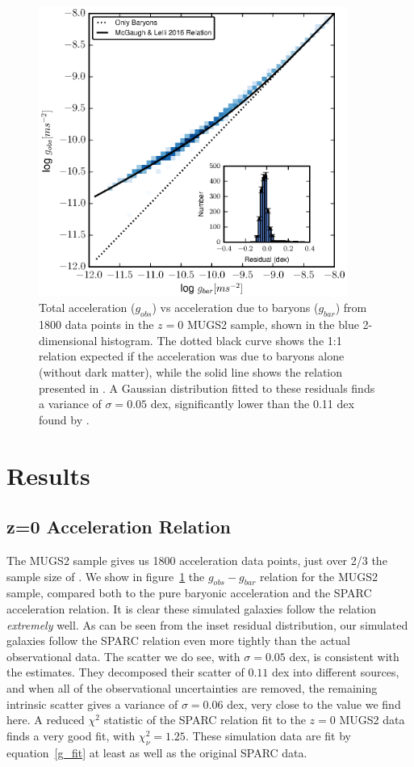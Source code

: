 \begin{figure}
    \includegraphics[width=0.9\textwidth]{figures4/SPARC_plot.eps}
    \caption[Total acceleration vs. baryonic acceleration in MUGS2]{Total
    acceleration ($g_{obs}$) vs acceleration due to baryons ($g_{bar}$) from
    1800 data points in the $z=0$ MUGS2 sample, shown in the blue 2-dimensional
    histogram.  The dotted black curve shows the 1:1 relation expected if the
    acceleration was due to baryons alone (without dark matter), while the solid
    line shows the relation presented in \citet{McGaugh2016}.  A Gaussian
    distribution fitted to these residuals finds a variance of $\sigma=0.05$
    dex, significantly lower than the 0.11 dex found by \citet{McGaugh2016}.}
    \label{SPARC_plot}
\end{figure}
\section{Results}
\subsection{z=0 Acceleration Relation}
The MUGS2 sample gives us 1800 acceleration data points, just over 2/3 the
sample size of \citet{McGaugh2016}. We show in figure~\ref{SPARC_plot} the
$g_{obs}-g_{bar}$ relation for the MUGS2 sample, compared both to the pure
baryonic acceleration and the SPARC acceleration relation.  It is clear these
simulated galaxies follow the \citet{McGaugh2016} relation {\it extremely} well.
As can be seen from the inset residual distribution, our simulated galaxies
follow the SPARC relation even more tightly than the actual observational data.
The scatter we do see, with $\sigma=0.05$ dex, is consistent with the
\citet{McGaugh2016} estimates.  They decomposed their scatter of $0.11$
dex into different sources, and when all of the observational uncertainties are
removed, the remaining intrinsic scatter gives a variance of $\sigma=0.06$ dex,
very close to the value we find here.  A reduced $\chi^2$ statistic of the SPARC
relation fit to the $z=0$ MUGS2 data finds a very good fit, with $\chi^2_\nu =
1.25$.  These simulation data are fit by equation~\ref{g_fit} at least as well
as the original SPARC data.

